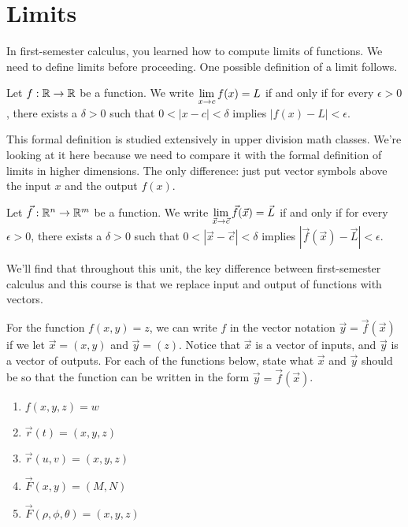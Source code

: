 \section{Limits}
In first-semester calculus, you learned how to compute limits of functions. We need to define limits before proceeding. One possible definition of a limit follows.
\begin{definition}
 Let $f:\mathbb{R}\to\mathbb{R}$ be a function.
 We write $\displaystyle \lim_{x\to c} f(x)=L$ if and only if for every $\epsilon>0$, there exists a $\delta>0$ such that $0<|x-c|<\delta$ implies $|f(x)-L|<\epsilon$.
\end{definition}
 This formal definition is studied extensively in upper division math classes. We're looking at it here because we need to compare it with the formal definition of limits in higher dimensions. The only difference: just put vector symbols above the input $x$ and the output $f(x)$.
\begin{definition}
 Let $\vec f:\mathbb{R}^n\to\mathbb{R}^m$ be a function.
 We write $\displaystyle \lim_{\vec x\to \vec c} \vec f(\vec x)=\vec L$ if and only if for every $\epsilon>0$, there exists a $\delta>0$ such that $0<|\vec x-\vec c|<\delta$ implies $|\vec f(\vec x)-\vec L|<\epsilon$.
\end{definition}
We'll find that throughout this unit, the key difference between first-semester calculus and this course is that we replace input and output of functions with vectors. 
 
\begin{problem}
 For the function $f(x,y)=z$, we can write $f$ in the vector notation $\vec y=\vec f(\vec x)$ if we let $\vec x=(x,y)$ and $\vec y=(z)$. Notice that $\vec x$ is a vector of inputs, and $\vec y$ is a vector of outputs. 
 For each of the functions below, state what $\vec x$ and $\vec y$ should be so that the function can be written in the form $\vec y = \vec f (\vec x)$.   
\begin{enumerate}
 \item $f(x,y,z)=w$
 \item $\vec r(t)=(x,y,z)$
 \item $\vec r(u,v)=(x,y,z)$
 \item $\vec F(x,y)=(M,N)$
 \item $\vec F(\rho,\phi,\theta)=(x,y,z)$
\end{enumerate}
\end{problem}


